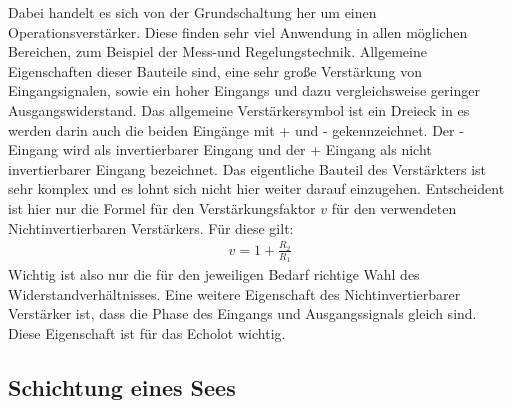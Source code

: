 \documentclass[12pt,a4paper,titlepage,headinclude,bibtotoc]{scrartcl}
\begin{document}
Dabei handelt es sich von der Grundschaltung her um einen Operationsverstärker.
Diese finden sehr viel Anwendung in allen möglichen Bereichen, zum Beispiel der Mess-und Regelungstechnik. 
Allgemeine Eigenschaften dieser Bauteile sind, eine sehr große Verstärkung von Eingangsignalen, sowie ein hoher Eingangs und dazu vergleichsweise geringer Ausgangswiderstand.
Das allgemeine Verstärkersymbol ist ein Dreieck in es werden darin auch die beiden
Eingänge mit + und - gekennzeichnet.
Der - Eingang wird als invertierbarer Eingang und 
der + Eingang als nicht invertierbarer Eingang bezeichnet.
Das eigentliche Bauteil des Verstärkters ist sehr komplex und es lohnt sich nicht hier 
weiter darauf einzugehen.
Entscheident ist hier nur die Formel für den Verstärkungsfaktor $v$ für den verwendeten 
Nichtinvertierbaren Verstärkers. Für diese gilt:
\begin{align}
 v = 1 + \frac{R_2}{R_1}
\end{align}
Wichtig ist also nur die für den jeweiligen Bedarf richtige Wahl des Widerstandverhältnisses.
Eine weitere Eigenschaft des Nichtinvertierbarer Verstärker ist, dass die Phase des Eingangs
und Ausgangssignals gleich sind. Diese Eigenschaft ist für das Echolot wichtig.


\subsection{Schichtung eines Sees}
\end{document}
